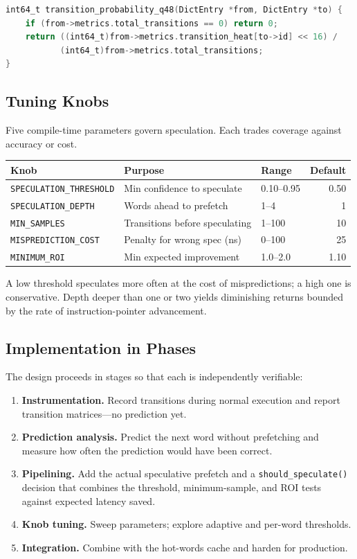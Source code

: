 \begin{lstlisting}[language=C]
int64_t transition_probability_q48(DictEntry *from, DictEntry *to) {
    if (from->metrics.total_transitions == 0) return 0;
    return ((int64_t)from->metrics.transition_heat[to->id] << 16) /
           (int64_t)from->metrics.total_transitions;
}
\end{lstlisting}

\subsection{Tuning Knobs}

Five compile-time parameters govern speculation. Each trades coverage against
accuracy or cost.

\begin{tabular}{lllr}
\toprule
Knob & Purpose & Range & Default \\
\midrule
\texttt{SPECULATION\_THRESHOLD} & Min confidence to speculate & 0.10--0.95 & 0.50 \\
\texttt{SPECULATION\_DEPTH} & Words ahead to prefetch & 1--4 & 1 \\
\texttt{MIN\_SAMPLES} & Transitions before speculating & 1--100 & 10 \\
\texttt{MISPREDICTION\_COST} & Penalty for wrong spec (ns) & 0--100 & 25 \\
\texttt{MINIMUM\_ROI} & Min expected improvement & 1.0--2.0 & 1.10 \\
\bottomrule
\end{tabular}

\medskip
\noindent A low threshold speculates more often at the cost of mispredictions;
a high one is conservative. Depth deeper than one or two yields diminishing
returns bounded by the rate of instruction-pointer advancement.

\subsection{Implementation in Phases}

The design proceeds in stages so that each is independently verifiable:

\begin{enumerate}
  \item \textbf{Instrumentation.} Record transitions during normal execution
        and report transition matrices---no prediction yet.
  \item \textbf{Prediction analysis.} Predict the next word without prefetching
        and measure how often the prediction would have been correct.
  \item \textbf{Pipelining.} Add the actual speculative prefetch and a
        \lstinline{should_speculate()} decision that combines the threshold,
        minimum-sample, and ROI tests against expected latency saved.
  \item \textbf{Knob tuning.} Sweep parameters; explore adaptive and per-word
        thresholds.
  \item \textbf{Integration.} Combine with the hot-words cache and harden for
        production.
\end{enumerate}

